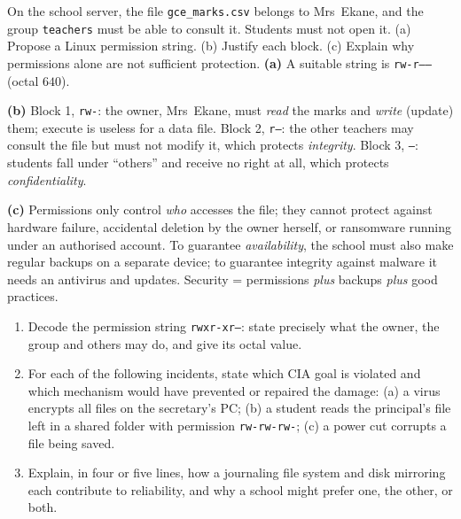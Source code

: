 \documentclass[11pt]{article}
\begin{document}
\begin{exoresolu}
On the school server, the file \texttt{gce\_marks.csv} belongs to Mrs~Ekane, and the group \texttt{teachers} must be able to consult it. Students must not open it. (a) Propose a Linux permission string. (b) Justify each block. (c) Explain why permissions alone are not sufficient protection.
\tcblower
\textbf{(a)} A suitable string is \texttt{rw-r-----} (octal $640$).

\textbf{(b)} Block 1, \texttt{rw-}: the owner, Mrs~Ekane, must \emph{read} the marks and \emph{write} (update) them; execute is useless for a data file. Block 2, \texttt{r--}: the other teachers may consult the file but must not modify it, which protects \emph{integrity}. Block 3, \texttt{---}: students fall under ``others'' and receive no right at all, which protects \emph{confidentiality}.

\textbf{(c)} Permissions only control \emph{who} accesses the file; they cannot protect against hardware failure, accidental deletion by the owner herself, or ransomware running under an authorised account. To guarantee \emph{availability}, the school must also make regular backups on a separate device; to guarantee integrity against malware it needs an antivirus and updates. Security = permissions \emph{plus} backups \emph{plus} good practices.
\end{exoresolu}

\begin{exercice}
\begin{enumerate}
\item Decode the permission string \texttt{rwxr-xr--}: state precisely what the owner, the group and others may do, and give its octal value.
\item For each of the following incidents, state which CIA goal is violated and which mechanism would have prevented or repaired the damage: (a) a virus encrypts all files on the secretary's PC; (b) a student reads the principal's file left in a shared folder with permission \texttt{rw-rw-rw-}; (c) a power cut corrupts a file being saved.
\item Explain, in four or five lines, how a journaling file system and disk mirroring each contribute to reliability, and why a school might prefer one, the other, or both.
\end{enumerate}
\end{exercice}
\end{document}
